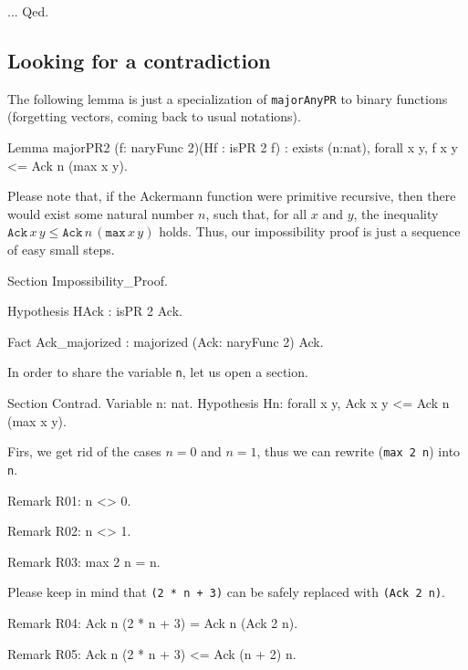 \begin{Coqsrc}
 ...
Qed.
\end{Coqsrc}

\subsection{Looking for a contradiction}

The following lemma is just a specialization of \texttt{majorAnyPR} to
binary functions (forgetting vectors, coming back to usual notations).

\begin{Coqsrc}
Lemma majorPR2 (f: naryFunc 2)(Hf : isPR 2 f)
  : exists (n:nat), forall x y,  f x y <= Ack n (max x  y).
\end{Coqsrc}

Please note that, if the Ackermann function were primitive recursive, then there would exist some natural number $n$, such that, for all $x$ and $y$, the inequality 
$\texttt{Ack}\,x\,y\leq \texttt{Ack}\,n\,(\texttt{max}\,x\,y)$ holds.
Thus, our impossibility proof is just a sequence of easy small steps.

\begin{Coqsrc}
Section Impossibility_Proof.

  Hypothesis HAck : isPR 2 Ack.

  Fact Ack_majorized : majorized (Ack: naryFunc 2)  Ack.
 \end{Coqsrc}
  
 In order to share the variable \texttt{n}, let us open a section.

\begin{Coqsrc}
  Section Contrad.
    Variable n: nat.
    Hypothesis  Hn: forall x y,  Ack x y <= Ack n (max x  y).
\end{Coqsrc}

Firs, we get rid of the cases $n=0$ and $n=1$, thus we can rewrite
(\texttt{max 2 n}) into \texttt{n}.

  \begin{Coqsrc}
    Remark R01: n <> 0.
  
    Remark R02: n <> 1.
   
    Remark R03: max 2 n = n.
\end{Coqsrc}

Please keep in mind that \texttt{(2 * n + 3)} can be safely replaced with 
\texttt{(Ack 2 n)}.

\begin{Coqsrc}
    Remark R04: Ack n (2 * n + 3) = Ack n (Ack 2 n).
       
    Remark R05: Ack n (2 * n + 3) <= Ack (n + 2) n.
\end{Coqsrc}


